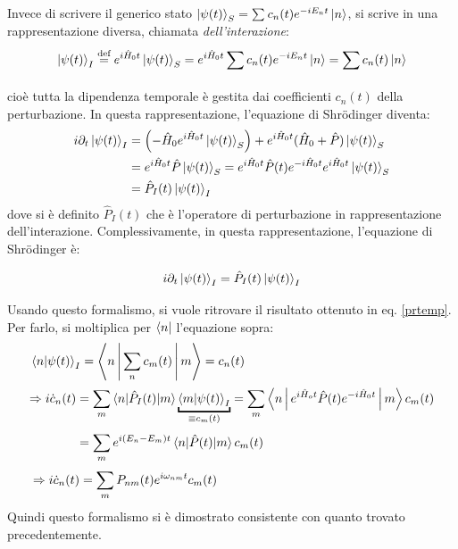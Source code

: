 \documentclass[11pt, a4paper]{scrartcl} %
\numberwithin{equation}{subsection}
\theoremstyle{style2}
\theoremstyle{style1}
\newenvironment{boxenv}[1][]{
    \begin{eqbox}[#1]
    }{
   \end{eqbox}
}
\begin{document}
Invece di scrivere il generico stato $\ket{\psi (t)}_S = \sum_{}^{} c_n(t) e^{-i E_n t} \ket{n} $, si scrive in una rappresentazione diversa, chiamata \textit{dell'interazione}:
\begin{equation}
	\ket{\psi (t)} _I \overset{\text{def}}{=} e^{i \hat{H}_0 t} \ket{\psi (t)}_S = e^{i \hat{H}_0 t}   \sum_{}^{} c_n(t) e^{-i E_n t} \ket{n} = \sum_{}^{} c_n(t) \ket{n} 
\end{equation}
cio\`e tutta la dipendenza temporale \`e gestita dai coefficienti $c_n(t)$ della perturbazione.
In questa rappresentazione, l'equazione di Shr\"odinger diventa:
\[
	\begin{split}
		i \partial _t \ket{\psi (t)} _I &= \left(-\hat{H}_0 e^{i \hat{H}_0 t} \ket{\psi (t)}_S \right) +e ^{i \hat{H}_0 t} (\hat{H}_0 + \hat{P}) \ket{\psi (t)} _S \\
		&= e^{i \hat{H}_0 t} \hat{P}\ket{\psi (t)} _S = e^{i \hat{H}_0 t} \hat{P}(t) e^{-i \hat{H}_0 t} e^{i \hat{H}_0 t} \ket{\psi (t)} _S\\
		&= \hat{P}_I(t) \ket{\psi (t)} _I
	\end{split}
\] 
dove si \`e definito $\hat{P}_I(t)$ che \`e l'operatore di perturbazione in rappresentazione dell'interazione.
Complessivamente, in questa rappresentazione, l'equazione di Shr\"odinger \`e:
\begin{boxenv}[]
\begin{equation}
	i \partial _t \ket{\psi (t)} _I = \hat{P}_I(t) \ket{\psi (t)} _I
\end{equation}
\end{boxenv}
Usando questo formalismo, si vuole ritrovare il risultato ottenuto in eq. \ref{prtemp}.
Per farlo, si moltiplica per $\bra{n} $ l'equazione sopra:
\[
	\begin{split}
		&\braket{n|\psi (t)} _I = \Braket{n|\sum_{n}^{} c_m(t)|m} = c_n(t)\\
		&\begin{split}
			\Rightarrow i \dot{c}_n(t) &= \sum_{m}^{} \braket{n|\hat{P}_I(t)|m} \underbracket{\braket{m|\psi (t)} _I}_{\equiv c_m(t)}  = \sum_{m}^{} \Braket{n|e^{i \hat{H}_o t} \hat{P}(t) e^{-i\hat{H}_0 t}|m} c_m(t) \\
			&= \sum_{m}^{} e ^{i (E_n - E_m)t} \braket{n|\hat{P}(t)|m} c_m(t)\\
		\end{split}\\
		&\Rightarrow i \dot{c}_n(t)= \sum_{m}^{} P_{nm} (t) e^{i\omega_{nm} t} c_m(t)
	\end{split}
\] 
Quindi questo formalismo si \`e dimostrato consistente con quanto trovato precedentemente.
\end{document}
